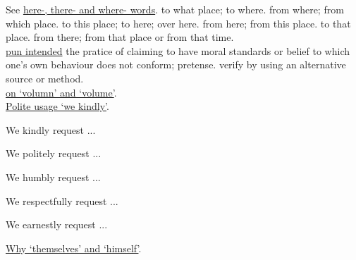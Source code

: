 \documentclass[hidelinks]{ctexart}
\begin{document}
See \href{https://en.wiktionary.org/wiki/hereon}{here-, there- and where- words}.
 to what place; to where.
 from where; from which place.
 to this place; to here; over here.
 from here; from this place.
 to that place.
 from there; from that place or from that time.
\\
\href{https://english.stackexchange.com/questions/32217/what-is-meant-by-pun-intended}{pun intended}
 the pratice of claiming to have moral standards or belief to which one's own behaviour does not conform; pretense.
 verify by using an alternative source or method.
\\
\href{http://commonerrorscalendar.blogspot.com/2013/04/volumnvolume-common-errors-in-english.html?m=1#:~:text=The%20archaic%20spelling%20of%20%22volumn,the%20e%20and%20the%20n.}{on `volumn' and `volume'}.
\\
\href{https://english.stackexchange.com/questions/96162/is-it-correct-to-say-i-kindly-request-you-to}{Polite usage `we kindly'}.
\begin{citemize}
    \item We kindly request ...
    \item We politely request ...
    \item We humbly request ...
    \item We respectfully request ...
    \item We earnestly request ...
\end{citemize}
\href{https://english.stackexchange.com/questions/31980/why-themselves-and-himself}{Why `themselves' and `himself'}.
\end{document}
